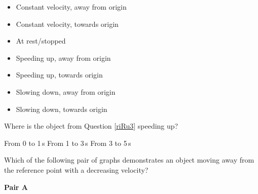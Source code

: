 \documentclass[../main-physics-problems.tex]{subfiles}
\begin{document}
\begin{questions}
\begin{minipage}{0.45\textwidth}
\centering
{}
\end{minipage}%
\hspace{2em}
\begin{minipage}{0.45\textwidth}
    \centering
\begin{itemize}[itemsep=0pt]
    \item Constant velocity, away from origin
    \item Constant velocity, towards origin
    \item At rest/stopped
    \item Speeding up, away from origin
    \item Speeding up, towards origin
    \item Slowing down, away from origin
    \item Slowing down, towards origin
\end{itemize}
\end{minipage}


\question \label{Xszkg}
Where is the object from Question \ref{riRu3} speeding up?

\begin{randomizechoices}[norandomize]
    \choice From 0 to 1\,s
    \choice From 1 to 3\,s
    \correctchoice From 3 to 5\,s
\end{randomizechoices}

\clearpage
\question 
Which of the following pair of graphs demonstrates an object moving away from the reference point with a decreasing velocity?

\bigskip

\begin{minipage}{0.45\textwidth}
\centering
\textbf{Pair A}

\vspace{1ex}


\end{minipage}
\end{questions}
\end{document}
